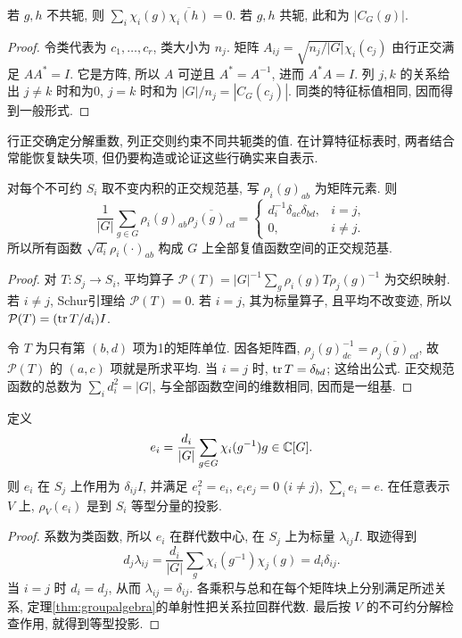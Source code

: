 \begin{corollary}[特征标列正交]\label{cor:columnorth}
若 $g,h$ 不共轭, 则 $\sum_i\chi_i(g)\overline{\chi_i(h)}=0$. 若 $g,h$ 共轭, 此和为 $|C_G(g)|$.
\end{corollary}
\begin{proof}
令类代表为 $c_1,\ldots,c_r$, 类大小为 $n_j$. 矩阵 $A_{ij}=\sqrt{n_j/|G|}\chi_i(c_j)$ 由行正交满足 $AA^*=I$. 它是方阵, 所以 $A$ 可逆且 $A^*=A^{-1}$, 进而 $A^*A=I$. 列 $j,k$ 的关系给出 $j\ne k$ 时和为0, $j=k$ 时和为 $|G|/n_j=|C_G(c_j)|$. 同类的特征标值相同, 因而得到一般形式.
\end{proof}
行正交确定分解重数, 列正交则约束不同共轭类的值. 在计算特征标表时, 两者结合常能恢复缺失项, 但仍要构造或论证这些行确实来自表示.

\begin{theorem}[矩阵系数正交]\label{thm:matrixorth}
对每个不可约 $S_i$ 取不变内积的正交规范基, 写 $\rho_i(g)_{ab}$ 为矩阵元素. 则
\[
 \frac1{|G|}\sum_{g\in G}\rho_i(g)_{ab}\overline{\rho_j(g)_{cd}}
 =\begin{cases}d_i^{-1}\delta_{ac}\delta_{bd},&i=j,\\0,&i\ne j.\end{cases}
\]
所以所有函数 $\sqrt{d_i}\rho_i(\cdot)_{ab}$ 构成 $G$ 上全部复值函数空间的正交规范基.
\end{theorem}
\begin{proof}
对 $T:S_j\to S_i$, 平均算子
$\mathcal P(T)=|G|^{-1}\sum_g\rho_i(g)T\rho_j(g)^{-1}$ 为交织映射. 若 $i\ne j$, Schur引理给 $\mathcal P(T)=0$. 若 $i=j$, 其为标量算子, 且平均不改变迹, 所以 $\mathcal P(T)=(\operatorname{tr} T/d_i)I$.

令 $T$ 为只有第 $(b,d)$ 项为1的矩阵单位. 因各矩阵酉, $\rho_j(g)^{-1}_{dc}=\overline{\rho_j(g)_{cd}}$, 故 $\mathcal P(T)$ 的 $(a,c)$ 项就是所求平均. 当 $i=j$ 时, $\operatorname{tr} T=\delta_{bd}$; 这给出公式. 正交规范函数的总数为 $\sum_i d_i^2=|G|$, 与全部函数空间的维数相同, 因而是一组基.
\end{proof}

\begin{proposition}\label{prop:central-idempotent}
定义
\[
 e_i=\frac{d_i}{|G|}\sum_{g\in G}\chi_i(g^{-1})g\in\mathbb C[G].
\]
则 $e_i$ 在 $S_j$ 上作用为 $\delta_{ij}I$, 并满足 $e_i^2=e_i$, $e_ie_j=0$ ($i\ne j$), $\sum_i e_i=e$. 在任意表示 $V$ 上, $\rho_V(e_i)$ 是到 $S_i$ 等型分量的投影.
\end{proposition}
\begin{proof}
系数为类函数, 所以 $e_i$ 在群代数中心, 在 $S_j$ 上为标量 $\lambda_{ij}I$. 取迹得到
\[
 d_j\lambda_{ij}=\frac{d_i}{|G|}\sum_g\chi_i(g^{-1})\chi_j(g)
 =d_i\delta_{ij}.
\]
当 $i=j$ 时 $d_i=d_j$, 从而 $\lambda_{ij}=\delta_{ij}$. 各乘积与总和在每个矩阵块上分别满足所述关系, 定理\ref{thm:groupalgebra}的单射性把关系拉回群代数. 最后按 $V$ 的不可约分解检查作用, 就得到等型投影.
\end{proof}

